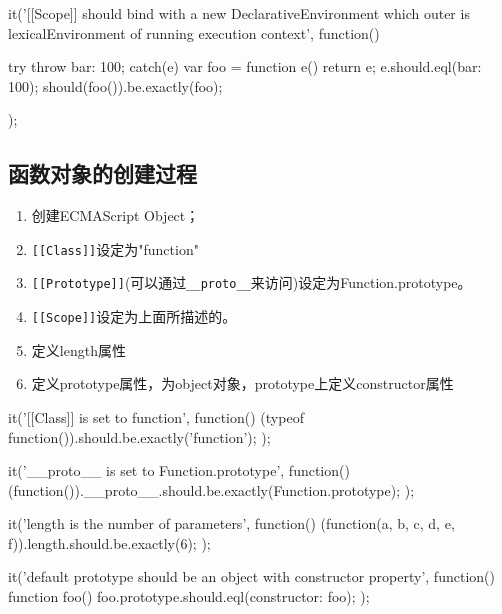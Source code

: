 \begin{JavaScript}
		it('[[Scope]] should bind with a new DeclarativeEnvironment which outer is lexicalEnvironment of running execution context', function(){

			try {
				throw {bar: 100};
			} catch(e) {
				var foo = function e() {
					return e;
				}
				e.should.eql({bar: 100});
			}
			should(foo()).be.exactly(foo);
		});	
\end{JavaScript}


\subsection{函数对象的创建过程}
\begin{enumerate}
\item 创建ECMAScript Object；
\item \lstinline![[Class]]!设定为"function"
\item \lstinline![[Prototype]]!(可以通过\lstinline!__proto__!来访问)设定为Function.prototype。
\item \lstinline![[Scope]]!设定为上面所描述的。
\item 定义length属性
\item 定义prototype属性，为object对象，prototype上定义constructor属性
\end{enumerate}
\begin{JavaScript}[此处是函数表达式]
		it('[[Class]] is set to function', function(){
			(typeof function(){}).should.be.exactly('function');
		});
\end{JavaScript}

\begin{JavaScript}
		it('__proto__ is set to Function.prototype', function(){
			(function(){}).__proto__.should.be.exactly(Function.prototype);
		});
\end{JavaScript}

\begin{JavaScript}
		it('length is the number of parameters', function(){
			(function(a, b, c, d, e, f){}).length.should.be.exactly(6);
		});
\end{JavaScript}

\begin{JavaScript}
		it('default prototype should be an object with constructor property', function(){
			function foo(){}
			foo.prototype.should.eql({constructor: foo});
		});
\end{JavaScript}

